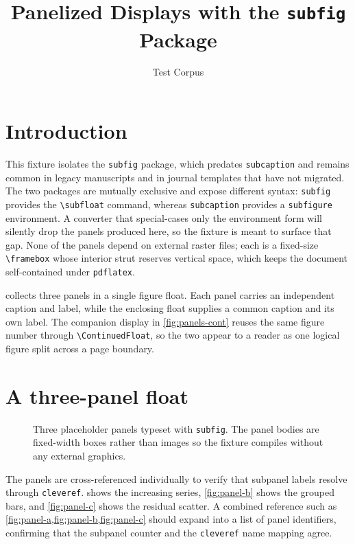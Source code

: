 \documentclass[11pt]{article}
\title{Panelized Displays with the \texttt{subfig} Package}
\author{Test Corpus}
\date{}
\begin{document}
\maketitle

\section{Introduction}

This fixture isolates the \texttt{subfig} package, which predates
\texttt{subcaption} and remains common in legacy manuscripts and in journal
templates that have not migrated. The two packages are mutually exclusive and
expose different syntax: \texttt{subfig} provides the \verb|\subfloat| command,
whereas \texttt{subcaption} provides a \texttt{subfigure} environment. A
converter that special-cases only the environment form will silently drop the
panels produced here, so the fixture is meant to surface that gap. None of the
panels depend on external raster files; each is a fixed-size \verb|\framebox|
whose interior strut reserves vertical space, which keeps the document
self-contained under \texttt{pdflatex}.

 collects three panels in a single figure float. Each panel
carries an independent caption and label, while the enclosing float supplies a
common caption and its own label. The companion display in
\cref{fig:panels-cont} reuses the same figure number through
\verb|\ContinuedFloat|, so the two appear to a reader as one logical figure
split across a page boundary.

\section{A three-panel float}

\begin{figure}[htbp]
\centering
{}
\hfill
{}
\hfill
{}
\caption{Three placeholder panels typeset with \texttt{subfig}. The panel
  bodies are fixed-width boxes rather than images so the fixture compiles
  without any external graphics.}
\label{fig:panels}
\end{figure}

The panels are cross-referenced individually to verify that subpanel labels
resolve through \texttt{cleveref}.  shows the increasing
series, \cref{fig:panel-b} shows the grouped bars, and \cref{fig:panel-c} shows
the residual scatter. A combined reference such as
\cref{fig:panel-a,fig:panel-b,fig:panel-c} should expand into a list of panel
identifiers, confirming that the subpanel counter and the \texttt{cleveref}
name mapping agree.
\end{document}
